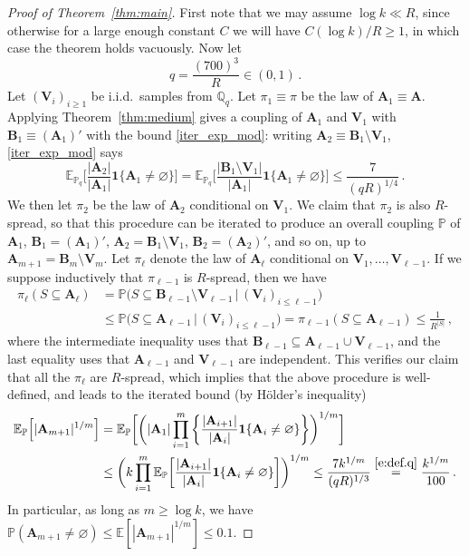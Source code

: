 \documentclass[11pt,reqno]{amsart}
\theoremstyle{plain}
\theoremstyle{definition}
\theoremstyle{remark}
\newcommand{\E}{\mathbb{E}}
\newcommand{\Q}{\mathbb{Q}}
\newcommand{\PP}{\mathbb{P}}
\newcommand{\EE}{\mathbb{E}}
\newcommand{\beq}{\begin{equation}}
\newcommand{\eeq}{\end{equation}}
\newcommand{\bA}{\mathbf{A}}
\newcommand{\bV}{\mathbf{V}}
\newcommand{\bB}{\mathbf{B}}
\renewcommand{\emptyset}{\varnothing}
\begin{document}
\begin{proof}[Proof of Theorem~\ref{thm:main}]
First note that we may assume $\log k\ll R$, since otherwise  for a large enough constant $C$ we will have $C(\log k)/R\ge1$, in which case the theorem holds vacuously. Now let
	\beq\label{e:def.q}
	q = \frac{(700)^3}{R} \in(0,1)\,.
	\eeq
Let $(\bV_i)_{i\ge1}$ be i.i.d.\ samples from $\Q_q$. 
Let $\pi_1\equiv\pi$ be the law of $\bA_1\equiv\bA$.
Applying Theorem~\ref{thm:medium} gives a coupling of $\bA_1$ and $\bV_1$ with $\bB_1\equiv (\bA_1)'$ with the bound \eqref{iter_exp_mod}: writing 
$\bA_2\equiv \bB_1\setminus \bV_1$,
\eqref{iter_exp_mod} says
	\[\EE_{\PP_q} \bigg[\frac{|\bA_2|}{|\bA_1|}
	\mathbf{1}\{\bA_1\ne\emptyset\}\bigg]
	=\EE_{\PP_q} \bigg[\frac{|\bB_1\setminus\bV_1|}{|\bA_1|}
	\mathbf{1}\{\bA_1\ne\emptyset\}\bigg]
	\leq \frac{7}{(qR)^{1/4}}\,.
	\]
We then let $\pi_2$ be the law of $\bA_2$  conditional on $\bV_1$.
 We claim that $\pi_2$ is also $R$-spread, so that this procedure can be iterated to produce an overall coupling $\PP$ of $\bA_1$, $\bB_1=(\bA_1)'$, $\bA_2=\bB_1\setminus\bV_1$, $\bB_2=(\bA_2)'$, and so on, up to $\bA_{m+1}=\bB_m\setminus\bV_m$. Let $\pi_\ell$ denote the law of $\bA_\ell$
 conditional on $\bV_1,\ldots,\bV_{\ell-1}$.  If we suppose inductively that $\pi_{\ell-1}$ is $R$-spread, then we have
	\begin{align*}
	\pi_\ell(S\subseteq \bA_\ell)
	&=\PP\Big(S\subseteq \bB_{\ell-1}\setminus\bV_{\ell-1}
		\,\Big|\, (\bV_i)_{i \le \ell-1} \Big) \\
	&\le \PP\Big(S\subseteq \bA_{\ell-1}
		\,\Big|\, (\bV_i)_{i \le \ell-1} \Big)
	= \pi_{\ell-1}(S\subseteq \bA_{\ell-1}) \le \frac{1}{R^{|S|}}\,,
	\end{align*}
where  the intermediate inequality uses that $\bB_{\ell-1}\subseteq\bA_{\ell-1}\cup\bV_{\ell-1}$, and the last equality uses that $\bA_{\ell-1}$ and $\bV_{\ell-1}$ are independent.  This verifies our claim that all the $\pi_\ell$ are $R$-spread, which implies that the above procedure is well-defined, and leads to the iterated bound (by H\"older's inequality) 
	\begin{align*}
	\E_{\PP}\Big[ |\bA_{m+1}|^{1/m}\Big]
	& = \E_{\PP}
	\bigg[ \bigg(
	|\bA_1|
	\prod_{i=1}^m\bigg\{\frac{|\bA_{i+1}|}{|\bA_i|}
	\mathbf{1}\{\bA_i\ne\emptyset\}\bigg\}
	\bigg)^{1/m}
	\bigg]
	\\
	&
	\le \bigg( k
	\prod_{i=1}^m \E_{\PP}
	\bigg[\frac{|\bA_{i+1}|}{|\bA_i|}\mathbf{1}\{\bA_i\ne\emptyset \}\bigg]
	\bigg)^{1/m}
	\le 
	\frac{7k^{1/m}}{(qR)^{1/3}}
	\stackrel{\eqref{e:def.q}}{=} \frac{k^{1/m}}{100}\,.
	\end{align*}
In particular, as long as $m\ge \log k$, we have $\PP(\bA_{m+1}\ne\emptyset)
\le \E[|\bA_{m+1}|^{1/m}] \le 0.1$. 


\end{proof}
\end{document}
